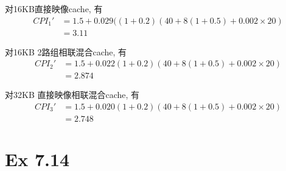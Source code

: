 \begin{solve}
\begin{enumerate}
    对16KB直接映像cache, 有
    \begin{align*}
      CPI_1' &= 1.5 + 0.029 ((1+0.2) (40 + 8(1 + 0.5) + 0.002 \times 20)\\
      &= 3.11
    \end{align*}

    对16KB 2路组相联混合cache, 有
    \begin{align*}
      CPI_2' &= 1.5 + 0.022 (1+0.2) (40 + 8(1 + 0.5) + 0.002 \times 20)\\
      &= 2.874
    \end{align*}

    对32KB 直接映像相联混合cache, 有
    \begin{align*}
      CPI_3' &= 1.5 + 0.020 (1+0.2) (40 + 8(1 + 0.5) + 0.002 \times 20)\\
      &= 2.748
    \end{align*}
\end{enumerate}
\end{solve}

\section{Ex 7.14}

